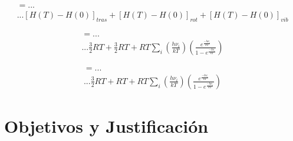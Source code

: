 \documentclass{beamer}
\begin{document}
\begin{frame}[fragile]


\begin{multline}
[H(298.15)-H(0)] =... \\... [H(T)-H(0)]_{tras}+[H(T)-H(0)]_{rot}+[H(T)-H(0)]_{vib}
\end{multline}


\begin{multline}
[H(298.15)-H(0)] =... \\... \mathrm{\frac{3}{2}} RT+ \mathrm{\frac{3}{2}} RT + RT \sum_i \left(\frac{h\nu_i}{kT}\right)\left(\frac{e^{\frac{-h\nu_i}{kT}}}{1-e^{\frac{-h\nu_i}{kT}}}\right)
\end{multline}

\begin{multline}
[H(298.15)-H(0)] =... \\... \mathrm{\frac{3}{2}} RT+  RT + RT \sum_i \left(\frac{h\nu_i}{kT}\right)\left(\frac{e^{\frac{-h\nu_i}{kT}}}{1-e^{\frac{-h\nu_i}{kT}}}\right)
\end{multline}

\end{frame}













\section{Objetivos y Justificación}
\end{document}
